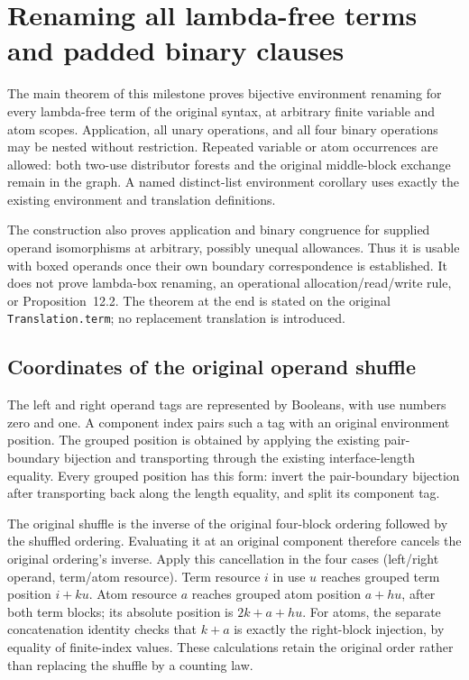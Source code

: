 \clearpage
\section{Renaming all lambda-free terms and padded binary clauses}
\label{sec:copying-lambda-free-renaming}
The main theorem of this milestone proves bijective environment renaming for
every lambda-free term of the original syntax, at arbitrary finite variable and
atom scopes. Application, all unary operations, and all four binary operations
may be nested without restriction. Repeated variable or atom occurrences are
allowed: both two-use distributor forests and the original middle-block exchange
remain in the graph. A named distinct-list environment corollary uses exactly
the existing environment and translation definitions.

The construction also proves application and binary congruence for supplied
operand isomorphisms at arbitrary, possibly unequal allowances. Thus it is usable
with boxed operands once their own boundary correspondence is established. It
does not prove lambda-box renaming, an operational allocation/read/write rule,
or Proposition~12.2. The theorem at the end is stated on the original
\texttt{Translation.term}; no replacement translation is introduced.

\subsection{Coordinates of the original operand shuffle}

The left and right operand tags are represented by Booleans, with use numbers
zero and one. A component index pairs such a tag with an original environment
position. The grouped position is obtained by applying the existing pair-boundary
bijection and transporting through the existing interface-length equality.
Every grouped position has this form: invert the pair-boundary bijection after
transporting back along the length equality, and split its component tag.


The original shuffle is the inverse of the original four-block ordering
followed by the shuffled ordering. Evaluating it at an original component
therefore cancels the original ordering's inverse. Apply this cancellation in
the four cases (left/right operand, term/atom resource). Term resource $i$ in use
$u$ reaches grouped term position $i+ku$. Atom resource $a$ reaches grouped atom
position $a+hu$, after both term blocks; its absolute position is $2k+a+hu$.
For atoms, the separate concatenation identity checks that $k+a$ is exactly the
right-block injection, by equality of finite-index values. These calculations
retain the original order rather than replacing the shuffle by a counting law.

